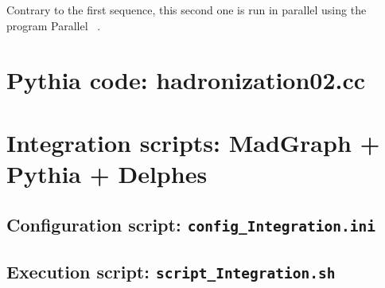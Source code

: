 \documentclass[12pt, oneside]{book}              %
\begin{document}
\begin{itemize}
Contrary to the first sequence, this second one is run in parallel using
the program Parallel ~\cite{Tange2011a}.
\end{itemize}




\begin{appendices}
\chapter[Pythia code]{Pythia code: hadronization02.cc}\label{App:hadronization02.cc}


\chapter[Integration scripts]{Integration scripts: MadGraph + Pythia + Delphes}\label{App:scripts}
\section{Configuration script: \texttt{config\_Integration.ini}}\label{sec:Configuration_script}

\section{Execution script: \texttt{script\_Integration.sh}}\label{sec:Execution_script}

\end{appendices}




	
\end{document}
